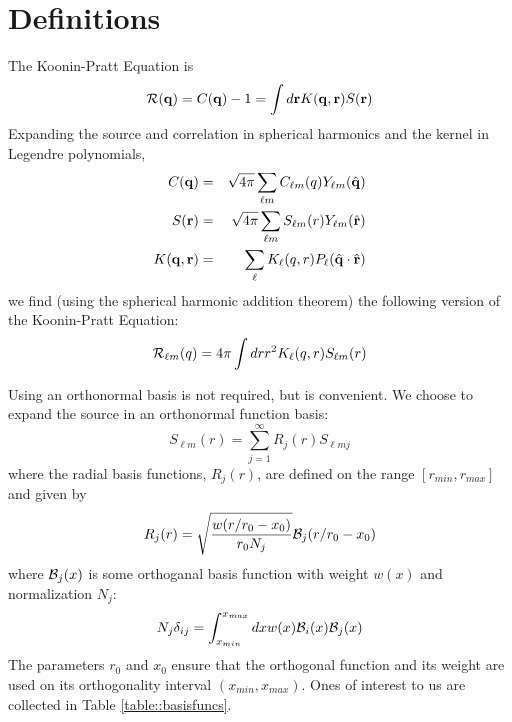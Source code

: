 \documentclass[aps,prl,twocolumn,floatfix,preprintnumbers,showpacs]{revtex4}
\begin{document}
\section{Definitions}    
The Koonin-Pratt Equation is
\begin{equation}
    {\cal R}({\bf q})=C({\bf q})-1=\int d{\bf r} K({\bf q},{\bf r}) S({\bf r})
    \label{3dkooninpratt}    
\end{equation}
Expanding the source and correlation in spherical harmonics and the kernel in Legendre polynomials,
\begin{eqnarray}    
     C({\bf q}) & = & \sqrt{4\pi} \sum_{\ell m} C_{\ell m}(q) Y_{\ell m}(\hat{\bf q})   \\
     S({\bf r}) & = & \sqrt{4\pi} \sum_{\ell m} S_{\ell m}(r) Y_{\ell m}(\hat{\bf r})\\
     K({\bf q},{\bf r})     & = & \sum_{\ell} K_{\ell}(q,r) P_{\ell}(\hat{\bf q}\cdot\hat{\bf r})                    
\end{eqnarray}
we find (using the spherical harmonic addition theorem) the following version of the Koonin-Pratt Equation: 
\begin{equation}
    {\cal R}_{\ell m}(q)=4\pi\int dr r^{2} K_{\ell}(q,r) S_{\ell m}(r)
    \label{1dkooninpratt}    
\end{equation}

Using an orthonormal basis is not required, but is convenient.
We choose to expand the source in an orthonormal function basis:
\begin{equation}
    S_{\ell m}(r) = \sum_{j=1}^{\infty} R_{j}(r) S_{\ell m j}
\end{equation}
where the radial basis functions, $R_{j}(r)$, are defined on the range $[r_{min},r_{max}]$ and given by
\begin{equation}
    R_{j}(r) = \sqrt{\frac{w(r/r_{0}-x_{0})}{r_{0} N_{j}}} {\cal B}_{j}(r/r_{0}-x_{0})                    
\end{equation}
where ${\cal B}_{j}(x)$ is some orthoganal basis function with weight $w(x)$ and normalization $N_{j}$: \begin{equation}
    N_{j}\delta_{ij} = \int_{x_{min}}^{x_{{max}}} dx w(x) {\cal B}_{i}(x) {\cal B}_{j}(x)                    
\end{equation}
The parameters $r_{0}$ and $x_{0}$ ensure that the orthogonal function and its weight are used on its orthogonality interval $(x_{min},x_{max})$.  Ones of interest to us are collected in Table \ref{table::basisfuncs}.    
  
\end{document}
